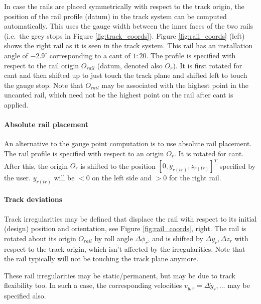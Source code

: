\documentclass[12pt]{report}
\begin{document}
In case the rails are placed symmetrically with respect to the track
origin, the position of the rail profile (datum) in the track system can
be computed automatically. This uses the gauge width between the inner
faces of the two rails (i.e.\ the grey stops in Figure
\ref{fig:track_coords}).  Figure \ref{fig:rail_coords} (left) shows the
right rail as it is seen in the track system. This rail has an installation
angle of $-2.9^\circ$ corresponding to a cant of $1:20$. The profile is
specified with respect to the rail origin $O_{rail}$ (datum, denoted also
$O_{r}$). It is first rotated for cant and then shifted up to just touch
the track plane and shifted left to touch the gauge stop. Note that
$O_{rail}$ may be associated with the highest point in the uncanted rail,
which need not be the highest point on the rail after cant is applied.

\paragraph{Absolute rail placement}

An alternative to the gauge point computation is to use absolute rail
placement. The rail profile is specified with respect to an origin $O_r$.
It is rotated for cant. After this, the origin $O_r$ is shifted to the
position $[0,y_{r(tr)},z_{r(tr)}]^T$ specified by the user. $y_{r(tr)}$
will be $<0$ on the left side and $>0$ for the right rail.

\paragraph{Track deviations}

Track irregularities may be defined that displace the rail with respect to
its initial (design) position and orientation, see Figure
\ref{fig:rail_coords}, right. The rail is rotated about its origin
$O_{rail}$ by roll angle $\Delta\phi_{r}$, and is shifted by $\Delta
y_{r},\Delta z_{r}$ with respect to the track origin, which isn't
affected by the irregularities. Note that the rail typically will not be
touching the track plane anymore.

These rail irregularities may be static/permanent, but may be due to track
flexibility too. In such a case, the corresponding velocities
$v_{y,r}=\Delta\dot{y}_{r}, \ldots$ may be specified also.
\end{document}
